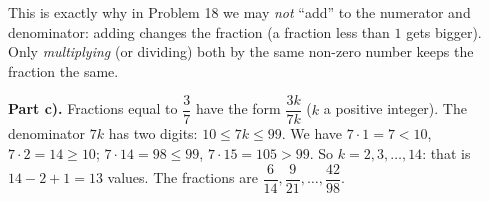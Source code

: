 {\begin{warnbox}This is exactly why in Problem 18 we may \emph{not} ``add'' to the numerator and denominator: adding changes the fraction (a fraction less than $1$ gets bigger). Only \emph{multiplying} (or dividing) both by the same non-zero number keeps the fraction the same.\end{warnbox}

\par\smallskip\textbf{Part c).}
Fractions equal to $\dfrac37$ have the form $\dfrac{3k}{7k}$ ($k$ a positive integer). The denominator $7k$ has two digits: $10\le 7k\le 99$. We have $7\cdot 1=7<10$, $7\cdot 2=14\ge 10$; $7\cdot 14=98\le 99$, $7\cdot 15=105>99$. So $k=2,3,\dots,14$: that is $14-2+1=13$ values.
The fractions are $\dfrac{6}{14},\dfrac{9}{21},\dots,\dfrac{42}{98}$.

}

